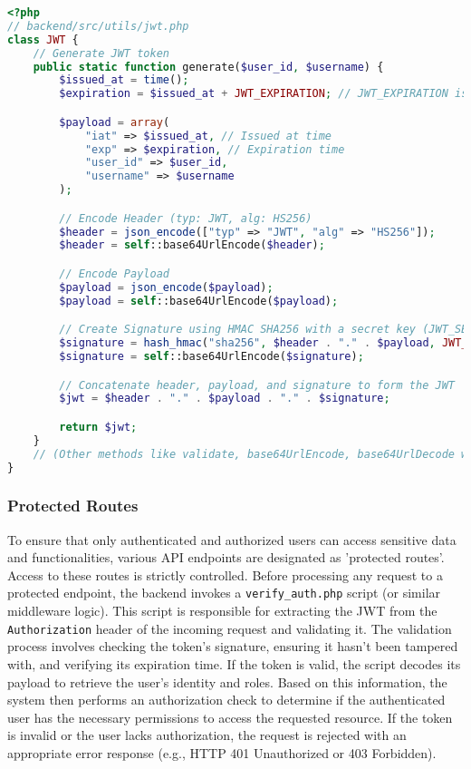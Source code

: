 \documentclass{report}
\begin{document}
\begin{lstlisting}[caption={Code Snippet 4.2: Simplified \texttt{generate()} function from \texttt{JWT.php}, illustrating the creation of a JSON Web Token upon successful user authentication.},label={lst:jwt_generate},language=PHP]
<?php
// backend/src/utils/jwt.php
class JWT {
    // Generate JWT token
    public static function generate($user_id, $username) {
        $issued_at = time();
        $expiration = $issued_at + JWT_EXPIRATION; // JWT_EXPIRATION is a constant defined in auth_config.php

        $payload = array(
            "iat" => $issued_at, // Issued at time
            "exp" => $expiration, // Expiration time
            "user_id" => $user_id,
            "username" => $username
        );

        // Encode Header (typ: JWT, alg: HS256)
        $header = json_encode(["typ" => "JWT", "alg" => "HS256"]);
        $header = self::base64UrlEncode($header);

        // Encode Payload
        $payload = json_encode($payload);
        $payload = self::base64UrlEncode($payload);

        // Create Signature using HMAC SHA256 with a secret key (JWT_SECRET)
        $signature = hash_hmac("sha256", $header . "." . $payload, JWT_SECRET, true);
        $signature = self::base64UrlEncode($signature);

        // Concatenate header, payload, and signature to form the JWT
        $jwt = $header . "." . $payload . "." . $signature;

        return $jwt;
    }
    // (Other methods like validate, base64UrlEncode, base64UrlDecode would also be present)
}
\end{lstlisting}

\subsubsection{Protected Routes}
\label{sec:protected_routes}
To ensure that only authenticated and authorized users can access sensitive data and functionalities, various API endpoints are designated as 'protected routes'. Access to these routes is strictly controlled. Before processing any request to a protected endpoint, the backend invokes a \texttt{verify\_auth.php} script (or similar middleware logic). This script is responsible for extracting the JWT from the \texttt{Authorization} header of the incoming request and validating it. The validation process involves checking the token's signature, ensuring it hasn't been tampered with, and verifying its expiration time. If the token is valid, the script decodes its payload to retrieve the user's identity and roles. Based on this information, the system then performs an authorization check to determine if the authenticated user has the necessary permissions to access the requested resource. If the token is invalid or the user lacks authorization, the request is rejected with an appropriate error response (e.g., HTTP 401 Unauthorized or 403 Forbidden).
\end{document}
